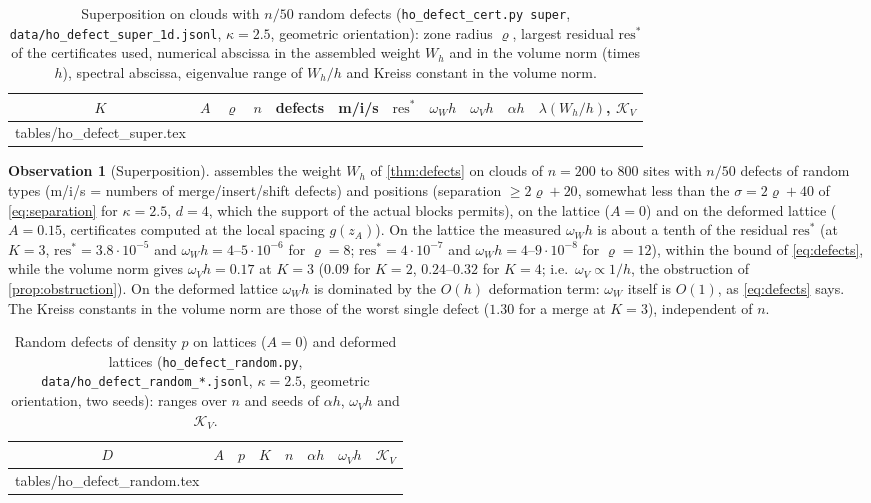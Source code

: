 \documentclass[11pt,a4paper]{article}
\makeatletter
\theoremstyle{plain}
\theoremstyle{definition}
\newtheorem{observation}[theorem]{Observation}
\theoremstyle{remark}
\numberwithin{equation}{section}
\newcommand{\res}{\mathrm{res}}
\newcommand{\inputrows}[1]{\@@input #1 }%
\makeatother
\begin{document}
\begin{table}[t]
\centering
\caption{Superposition on clouds with $n/50$ random defects (\texttt{ho\_defect\_cert.py super}, \texttt{data/ho\_defect\_super\_1d.jsonl}, $\kappa=2.5$, geometric orientation): zone radius $\varrho$, largest residual $\res^*$ of the certificates used, numerical abscissa in the assembled weight $W_h$ and in the volume norm (times $h$), spectral abscissa, eigenvalue range of $W_h/h$ and Kreiss constant in the volume norm.}\label{tab:defectsuper}
\scriptsize\setlength{\tabcolsep}{3.5pt}
\begin{tabular}{cccccclllll}
\toprule
$K$ & $A$ & $\varrho$ & $n$ & defects & m/i/s & $\res^*$ & $\omega_Wh$ & $\omega_Vh$ & $\alpha h$ & $\lambda(W_h/h)$, $\mathcal K_V$\\
\midrule
\inputrows{tables/ho_defect_super.tex}
\bottomrule
\end{tabular}
\end{table}

\begin{observation}[Superposition]\label{obs:super}
 assembles the weight $W_h$ of \cref{thm:defects} on clouds of $n=200$ to $800$ sites with $n/50$ defects of random types (m/i/s = numbers of merge/insert/shift defects) and positions (separation $\ge2\varrho+20$, somewhat less than the $\sigma=2\varrho+40$ of \eqref{eq:separation} for $\kappa=2.5$, $d=4$, which the support of the actual blocks permits), on the lattice ($A=0$) and on the deformed lattice ($A=0.15$, certificates computed at the local spacing $g(z_A)$). On the lattice the measured $\omega_Wh$ is about a tenth of the residual $\res^*$ (at $K=3$, $\res^*=3.8\cdot10^{-5}$ and $\omega_Wh=4$--$5\cdot10^{-6}$ for $\varrho=8$; $\res^*=4\cdot10^{-7}$ and $\omega_Wh=4$--$9\cdot10^{-8}$ for $\varrho=12$), within the bound of \eqref{eq:defects}, while the volume norm gives $\omega_Vh=0.17$ at $K=3$ ($0.09$ for $K=2$, $0.24$--$0.32$ for $K=4$; i.e.\ $\omega_V\propto1/h$, the obstruction of \cref{prop:obstruction}). On the deformed lattice $\omega_Wh$ is dominated by the $O(h)$ deformation term: $\omega_W$ itself is $O(1)$, as \eqref{eq:defects} says. The Kreiss constants in the volume norm are those of the worst single defect ($1.30$ for a merge at $K=3$), independent of $n$.
\end{observation}

\begin{table}[t]
\centering
\caption{Random defects of density $p$ on lattices ($A=0$) and deformed lattices (\texttt{ho\_defect\_random.py}, \texttt{data/ho\_defect\_random\_*.jsonl}, $\kappa=2.5$, geometric orientation, two seeds): ranges over $n$ and seeds of $\alpha h$, $\omega_Vh$ and $\mathcal K_V$.}\label{tab:defectrandom}
\footnotesize
\begin{tabular}{ccccclll}
\toprule
$D$ & $A$ & $p$ & $K$ & $n$ & $\alpha h$ & $\omega_Vh$ & $\mathcal K_V$\\
\midrule
\inputrows{tables/ho_defect_random.tex}
\bottomrule
\end{tabular}
\end{table}
\end{document}
